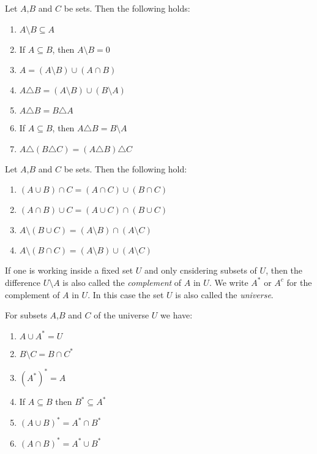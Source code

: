 \begin{proposition}
    Let $A$,$B$ and $C$ be sets. Then the following holds:
    \begin{enumerate}
        \item $ A \setminus B \subseteq A $
        \item If $ A \subseteq B $, then $ A \setminus B = 0 $
        \item $ A = (A \setminus B) \cup (A \cap B) $
        \item $ A \triangle B = (A \setminus B) \cup (B \setminus A) $
        \item $ A \triangle B = B \triangle A $
        \item If $ A \subseteq B $, then $ A \triangle B = B \setminus A $
        \item $ A \triangle (B \triangle C) = (A \triangle B) \triangle C $
    \end{enumerate}
\end{proposition}

\begin{proposition}
    Let $A$,$B$ and $C$ be sets. Then the following hold:
    \begin{enumerate}
        \item $ (A \cup B) \cap C = (A \cap C) \cup (B \cap C) $
        \item $ (A \cap B) \cup C = (A \cup C) \cap (B \cup C) $
        \item $ A \setminus (B \cup C) = (A \setminus B) \cap (A \setminus C) $
        \item $ A \setminus (B \cap C) = (A \setminus B) \cup (A \setminus C) $
    \end{enumerate}
\end{proposition}

\begin{definition}
    If one is working inside a fixed set $U$ and only cnsidering subsets of $U$, then the difference $U \setminus A$ is also called the \emph{complement} of $A$ in $U$.
    We write $A^*$ or $A^c$ for the complement of $A$ in $U$. In this case the set $U$ is also called the \emph{universe}.
\end{definition}

\begin{proposition}
    For subsets $A$,$B$ and $C$ of the universe $U$ we have:
    \begin{enumerate}
        \item $ A \cup A^* = U $
        \item $ B \setminus C = B \cap C^* $
        \item $ (A^*)^* = A $
        \item If $ A \subseteq B $ then $ B^* \subseteq A^* $
        \item $ (A \cup B)^* = A^* \cap B^* $
        \item $ (A \cap B)^* = A^* \cup B^* $
    \end{enumerate}
\end{proposition}

